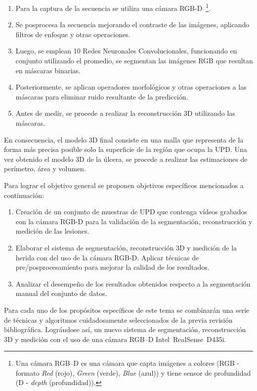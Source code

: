 \begin{enumerate}
	\item Para la captura de la secuencia se utiliza una cámara RGB-D~\footnote{Una cámara RGB–D es una cámara que capta imágenes a colores (RGB - formato \textit{Red} (rojo), \textit{Green} (verde), \textit{Blue} (azul)) y tiene sensor de profundidad (D - \textit{depth} (profundidad)).}.
	\item Se posprocesa la secuencia mejorando el contraste de las imágenes, aplicando filtros de enfoque y otras operaciones.
	\item Luego, se emplean 10 Redes Neuronales Convolucionales, funcionando en conjunto utilizando el promedio, se segmentan las imágenes RGB que resultan en máscaras binarias.
	\item Posteriormente, se aplican operadores morfológicos y otras operaciones a las máscaras para eliminar ruido resultante de la predicción.
	\item Antes de medir, se procede a realizar la reconstrucción 3D utilizando las máscaras.
\end{enumerate}


En consecuencia, el modelo 3D final consiste en una malla que representa de la forma más precisa posible solo la superficie de la región que ocupa la UPD. Una vez obtenido el modelo 3D de la úlcera, se procede a realizar las estimaciones de perímetro, área y volumen.

Para lograr el objetivo general se proponen objetivos específicos mencionados a continuación:

\begin{enumerate}
	\item Creación de un conjunto de muestras de UPD que contenga vídeos grabados con la cámara RGB-D para la validación de la segmentación, reconstrucción y medición de las lesiones.
	\item Elaborar el sistema de segmentación, reconstrucción 3D y medición de la herida con del uso de la cámara RGB-D. Aplicar técnicas de pre/posprocesamiento para mejorar la calidad de los resultados.
	\item Analizar el desempeño de los resultados obtenidos respecto a la segmentación manual del conjunto de datos.
\end{enumerate}

Para cada uno de los propósitos específicos de este tema se combinarán una serie de técnicas y algoritmos cuidadosamente seleccionados de la previa revisión bibliográfica. Lográndose así, un nuevo sistema de segmentación, reconstrucción 3D y medición con el uso de una cámara RGB–D Intel\textregistered~RealSense\texttrademark~D435i.

